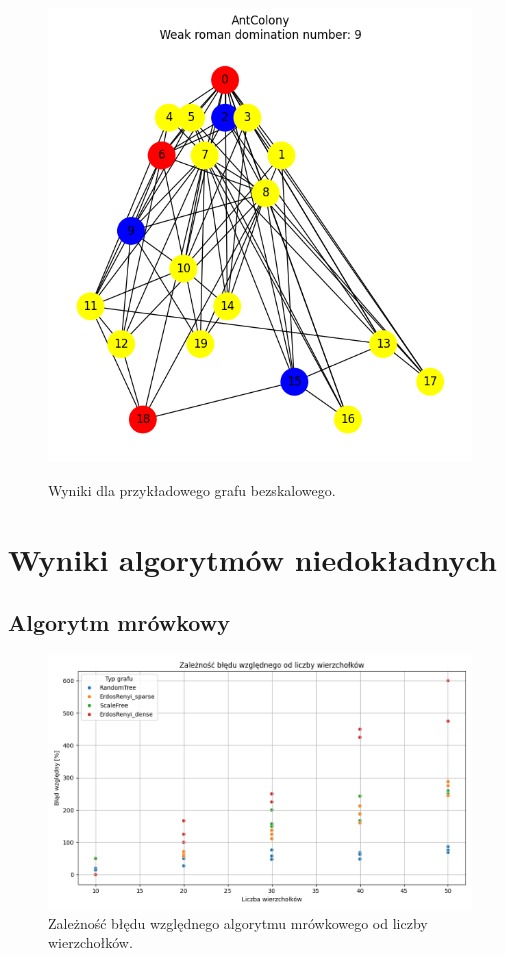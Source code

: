 \begin{figure}[H]
\begin{subcaptionbox}
            {\includegraphics[width=0.75\linewidth]{assets/plots/AntColony/ScaleFree_n20_i2_results.png}}
        \end{subcaptionbox}
    
        \caption{Wyniki dla przykładowego grafu bezskalowego.}
        \label{fig:tree}
    \end{figure}

\section{Wyniki algorytmów niedokładnych}

\subsection{Algorytm mrówkowy}

\begin{figure}[H]
    \centering
    \includegraphics[width=\textwidth]{assets/plots_approx/ants.png}
    \caption{Zależność błędu względnego algorytmu mrówkowego od liczby wierzchołków.}
    \label{fig:antsPlot}
\end{figure}

